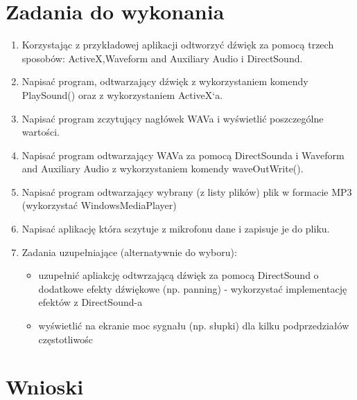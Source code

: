 \documentclass[a4paper,12pt]{extarticle}  %
\begin{document}
\section{Zadania do wykonania}
\begin{enumerate}
	\item Korzystając z przykładowej aplikacji odtworzyć dźwięk za pomocą trzech sposobów: ActiveX,Waveform and Auxiliary Audio i DirectSound.
	\item Napisać program, odtwarzający dźwięk z wykorzystaniem komendy PlaySound() oraz z wykorzystaniem ActiveX`a.
	\item Napisać program zczytujący nagłówek WAVa i wyświetlić poszczególne wartości.
	\item Napisać program odtwarzający WAVa za pomocą DirectSounda i Waveform and Auxiliary Audio z wykorzystaniem komendy waveOutWrite().
	\item Napisać program odtwarzający wybrany (z listy plików) plik w formacie MP3 (wykorzystać WindowsMediaPlayer)
	\item Napisać aplikację która sczytuje  z mikrofonu dane i zapisuje je do pliku.
	\item Zadania uzupełniające (alternatywnie do wyboru):
	      \begin{itemize}
		      \item uzupełnić apliakcję odtwrzającą dźwięk za pomocą DirectSound o dodatkowe efekty dźwiękowe (np. panning) - wykorzystać implementację efektów z DirectSound-a
		      \item wyświetlić na ekranie moc sygnału (np. słupki) dla kilku podprzedziałów częstotliwośc
	      \end{itemize}
\end{enumerate}
\section{Wnioski}
\end{document}
